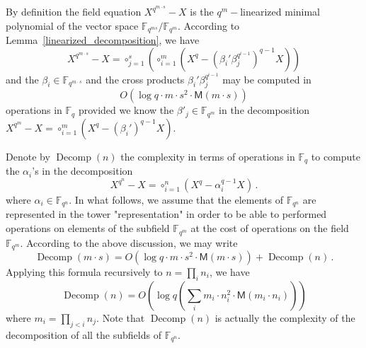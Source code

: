 \documentclass{sig-alternate}
\newcommand{\ff}[1]{\mathbb{F}_{#1}}
\newcommand{\qq}{q}
\newcommand{\nn}{n}
\newcommand{\qn}{{\qq^\nn}}
\newcommand{\basef}{\ff{\qq}}
\newcommand{\extf}{\ff{\qn}}
\DeclareMathOperator{\Decomp}{Decomp}
\newcommand{\bigO}{O}
\newcommand{\Mul}{\mathsf{M}}
\begin{document}

\medskip

By definition the field equation $X^{\qq^{m \cdot s}}-X$ is the $\qq^{m}-$linearized minimal polynomial of the vector space $\mathbb{F}_{\qq^{ms}}/\mathbb{F}_{\qq^m}$. According to Lemma~\ref{linearized_decomposition}, we have
$$X^{\qq^{m\cdot s}}-X=\circ_{j=1}^{s} \left( \circ_{i=1}^{m} (X^\qq-(\beta_i'  \beta_j^{\qq^{i-1}})^{q-1}   X) \right)$$
and the $\beta_i \in \mathbb{F}_{\qq^{m \cdot s}}$ and the cross products $\beta_i'  \beta_j^{\qq^{i-1}}$ may be computed in 
$$\bigO(\log q \cdot m \cdot s^2 \cdot \Mul(m \cdot s))$$
operations in $\basef$ provided we know the $\beta'_j \in \mathbb{F}_{\qq^m}$ in the decomposition $X^{\qq^{m}}-X=\circ_{i=1}^{m} (X^{\qq}-(\beta_i')^{\qq-1} X)$.

\medskip

Denote by $\Decomp(\nn)$ the complexity in terms of operations in $\basef$ to compute the $\alpha_i$'s in the decomposition 
$$X^{\qq^\nn}-X=\circ_{i=1}^{\nn} (X^q-\alpha_i^{q-1} X)\,.$$
where $\alpha_i \in \extf$. In what follows, we assume that the elements of $\mathbb{F}_{\qq^{\nn}}$ are represented in the tower "representation" in order to be able to 
performed operations on elements of the subfield $\mathbb{F}_{\qq^m}$ at the cost of operations on the field $\mathbb{F}_{\qq^m}$. According to the above discussion, we may write
$$\Decomp(m \cdot s)=\bigO(\log q \cdot m \cdot s^2 \cdot \Mul(m \cdot s))+\Decomp(n)\,.$$
Applying this formula recursively to $n=\prod_i n_i$, we have
$$\Decomp(n)=\bigO\left(\log q \left(\sum_i m_i \cdot n_i^2 \cdot \Mul(m_i \cdot n_i) \right) \right)$$
where $m_i=\prod_{j < i} n_j$. Note that  $\Decomp(\nn)$ is actually the complexity of the decomposition of all the subfields of $\extf$.

\medskip

\end{document}
